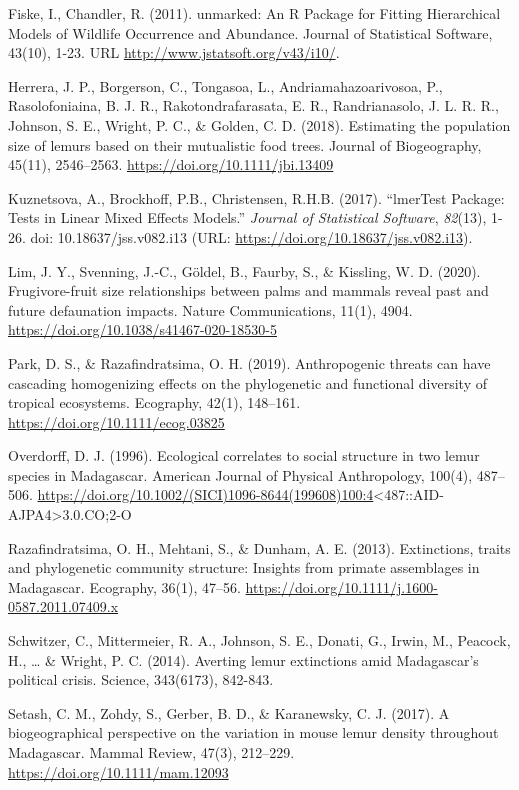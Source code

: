\documentclass[
  12pt,
]{article}
\begin{document}
Fiske, I., Chandler, R. (2011). unmarked: An R Package for Fitting
Hierarchical Models of Wildlife Occurrence and Abundance. Journal of
Statistical Software, 43(10), 1-23. URL
\url{http://www.jstatsoft.org/v43/i10/}.

Herrera, J. P., Borgerson, C., Tongasoa, L., Andriamahazoarivosoa, P.,
Rasolofoniaina, B. J. R., Rakotondrafarasata, E. R., Randrianasolo, J.
L. R. R., Johnson, S. E., Wright, P. C., \& Golden, C. D. (2018).
Estimating the population size of lemurs based on their mutualistic food
trees. Journal of Biogeography, 45(11), 2546--2563.
\url{https://doi.org/10.1111/jbi.13409}

Kuznetsova, A., Brockhoff, P.B., Christensen, R.H.B. (2017). ``lmerTest
Package: Tests in Linear Mixed Effects Models.'' \emph{Journal of
Statistical Software}, \emph{82}(13), 1-26. doi: 10.18637/jss.v082.i13
(URL: \url{https://doi.org/10.18637/jss.v082.i13}).

Lim, J. Y., Svenning, J.-C., Göldel, B., Faurby, S., \& Kissling, W. D.
(2020). Frugivore-fruit size relationships between palms and mammals
reveal past and future defaunation impacts. Nature Communications,
11(1), 4904. \url{https://doi.org/10.1038/s41467-020-18530-5}

Park, D. S., \& Razafindratsima, O. H. (2019). Anthropogenic threats can
have cascading homogenizing effects on the phylogenetic and functional
diversity of tropical ecosystems. Ecography, 42(1), 148--161.
\url{https://doi.org/10.1111/ecog.03825}

Overdorff, D. J. (1996). Ecological correlates to social structure in
two lemur species in Madagascar. American Journal of Physical
Anthropology, 100(4), 487--506.
\url{https://doi.org/10.1002/(SICI)1096-8644(199608)100:4}\textless487::AID-AJPA4\textgreater3.0.CO;2-O

Razafindratsima, O. H., Mehtani, S., \& Dunham, A. E. (2013).
Extinctions, traits and phylogenetic community structure: Insights from
primate assemblages in Madagascar. Ecography, 36(1), 47--56.
\url{https://doi.org/10.1111/j.1600-0587.2011.07409.x}

Schwitzer, C., Mittermeier, R. A., Johnson, S. E., Donati, G., Irwin,
M., Peacock, H., \ldots{} \& Wright, P. C. (2014). Averting lemur
extinctions amid Madagascar's political crisis. Science, 343(6173),
842-843.

Setash, C. M., Zohdy, S., Gerber, B. D., \& Karanewsky, C. J. (2017). A
biogeographical perspective on the variation in mouse lemur density
throughout Madagascar. Mammal Review, 47(3), 212--229.
\url{https://doi.org/10.1111/mam.12093}
\end{document}
